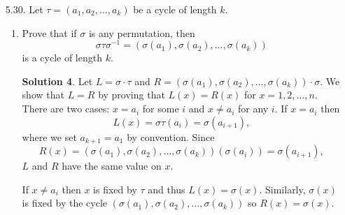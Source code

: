 \documentclass{article}
\theoremstyle{definition}
\newtheorem*{solution}{Solution}
\begin{document}
\begin{enumerate}
\begin{enumerate}
\begin{solution}
\end{solution}
\item $(12),(23),\dots,(n-1,n)$
\begin{solution}
We prove by induction that $(1k)$ can be written in terms of $(12),(23),\dots,(n-1,n)$ for $k = 2,3,\dots,n$.  The base case is clear: $(12) = (12)$.  The induction step follows from the identity $(1,k+1) = (1k)(k,k+1)(1k)$. By part (a), the set $(12),(13),\dots,(1n)$ generates $S_n$, and thus $(12),(23),\dots,(n-1,n)$ does as well.
\end{solution}
\item $(12),(12\dots n)$
\begin{solution}
We prove by induction that $(k-1,k)$ can be written in terms of $(12),(12\dots n)$ for $k = 2,3,\dots,n$.  The base case is again clear: $(12) = (12)$.  The induction step follows from the identity $(k,k+1) = (12\dots n)(k-1,k)(n\dots21).$  By part (b), the set $(12),(23),\dots,(n-1,n)$ generates $S_n$, and thus $(12),(12\dots n)$ does as well.
\end{solution}
\end{enumerate}
\item[5.30.] Let $\tau = (a_1, a_2, \dots, a_k)$ be a cycle of length $k$.
\begin{enumerate}
\item Prove that if $\sigma$ is any permutation, then
\[
\sigma\tau\sigma^{-1} = (\sigma(a_1),\sigma(a_2),\dots,\sigma(a_k))
\]
is a cycle of length $k$.
\begin{solution}
Let $L = \sigma \cdot \tau$ and $R = (\sigma(a_1),\sigma(a_2),\dots,\sigma(a_k)) \cdot \sigma$.  We show that $L = R$ by proving that $L(x) = R(x)$ for $x = 1,2,\dots, n$.  There are two cases: $x = a_i$ for some $i$ and $x \ne a_i$ for any $i$.  If $x = a_i$ then
\[
L(x) = \sigma\tau(a_i) = \sigma(a_{i+1}),
\]
where we set $a_{k+1} = a_1$ by convention.  Since 
\[
R(x) = (\sigma(a_1),\sigma(a_2),\dots,\sigma(a_k))(\sigma(a_i)) = \sigma(a_{i+1}),
\]
$L$ and $R$ have the same value on $x$.

If $x \ne a_i$ then $x$ is fixed by $\tau$ and thus $L(x) = \sigma(x)$.  Similarly, $\sigma(x)$ is fixed by the cycle $(\sigma(a_1),\sigma(a_2),\dots,\sigma(a_k))$ so $R(x) = \sigma(x)$.


\end{solution}
\end{enumerate}
\end{enumerate}
\end{document}
